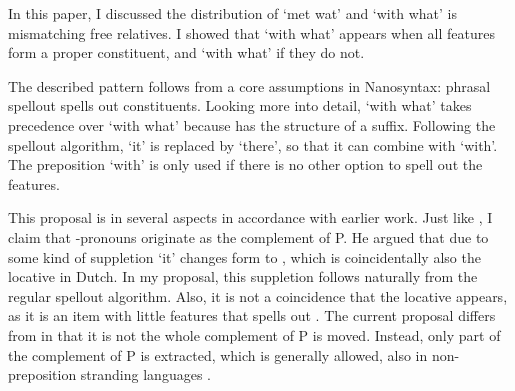 \documentclass{article}
\begin{document}
In this paper, I discussed the distribution of  `met wat' and  `with what' is mismatching free relatives. I showed that  `with what' appears when all features form a proper constituent, and  `with what' if they do not.

The described pattern follows from a core assumptions in Nanosyntax: phrasal spellout spells out constituents. Looking more into detail,  `with what' takes precedence over  `with what' because  has the structure of a suffix. Following the spellout algorithm,  `it' is replaced by  `there', so that it can combine with  `with'. The preposition  `with' is only used if there is no other option to spell out the features.

This proposal is in several aspects in accordance with earlier work.
Just like \citet{riemsdijk1978}, I claim that -pronouns originate as the complement of P. He argued that due to some kind of suppletion  `it' changes form to , which is coincidentally also the locative in Dutch. In my proposal, this suppletion follows naturally from the regular spellout algorithm. Also, it is not a coincidence that the locative appears, as it is an item with little features that spells out .
The current proposal differs from \citet{riemsdijk1978} in that it is not the whole complement of P is moved. Instead, only part of the complement of P is extracted, which is generally allowed, also in non-preposition stranding languages \citep{abels2003diss}.



\printbibliography
\end{document}

